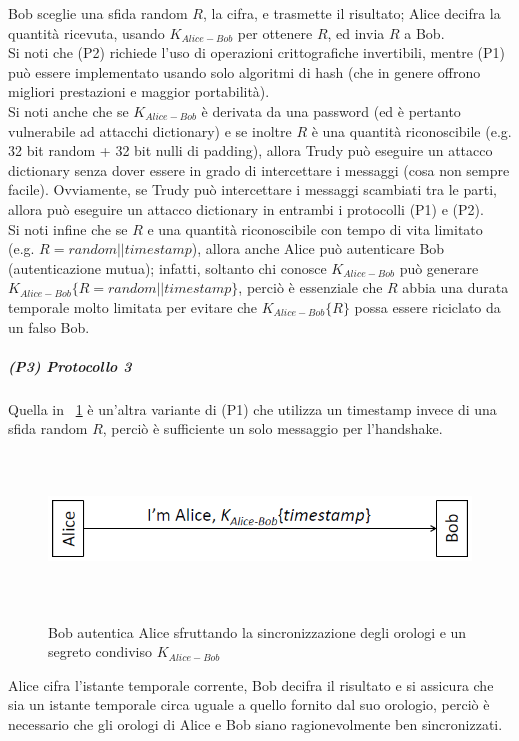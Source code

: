 Bob sceglie una sfida random $R$, la cifra, e trasmette il risultato; Alice decifra la quantità ricevuta, usando $K_{Alice-Bob}$ per ottenere $R$, ed invia $R$ a Bob.\\
Si noti che (P2) richiede l'uso di operazioni crittografiche invertibili, mentre (P1) può essere implementato usando solo algoritmi di hash (che in genere offrono migliori prestazioni e maggior portabilità). \\
Si noti anche che se $K_{Alice-Bob}$ è derivata da una password (ed è pertanto vulnerabile ad attacchi dictionary) e se inoltre $R$ è una quantità riconoscibile (e.g. 32 bit random + 32 bit nulli di padding), allora Trudy può eseguire un attacco dictionary senza dover essere in grado di intercettare i messaggi (cosa non sempre facile). Ovviamente, se Trudy può intercettare i messaggi scambiati tra le parti, allora può eseguire un attacco dictionary in entrambi i
protocolli (P1) e (P2).\\
Si noti infine che se $R$ e una quantità riconoscibile con tempo di vita limitato (e.g. $R = random||timestamp$), allora anche Alice può autenticare Bob (autenticazione mutua); infatti, soltanto chi conosce $K_{Alice-Bob}$ può generare $K_{Alice-Bob}\lbrace R = random||timestamp\rbrace$, perciò è essenziale che $R$ abbia una durata temporale molto limitata per evitare che $K_{Alice-Bob}\lbrace R\rbrace$ possa essere riciclato da un falso Bob.
\subparagraph{(P3) Protocollo 3}
Quella in \figurename~\ref{fig:ImgS20bis} è un'altra variante di (P1) che utilizza un timestamp invece di una sfida random $R$, perciò è sufficiente un solo messaggio per l'handshake.
\begin{figure}[htbp]
	\centering%
	\subfigure%
	{\includegraphics[height=4cm, width=12cm, keepaspectratio]{Immagini/autenticazione/ImgS20bis.png}}
	\caption{Bob autentica Alice sfruttando la sincronizzazione degli orologi e un segreto condiviso $K_{Alice-Bob}$\label{fig:ImgS20bis}} 	
\end{figure}
Alice cifra l'istante temporale corrente, Bob decifra il risultato e si assicura che sia un istante temporale circa uguale a quello fornito dal suo orologio, perciò è necessario che gli orologi di Alice e Bob siano ragionevolmente ben sincronizzati.\\
